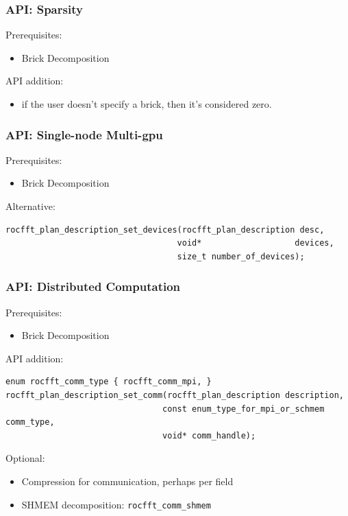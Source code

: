 \documentclass[10pt,aspectratio=169]{beamer}
\begin{document}
\begin{frame}
  \frametitle{API: Sparsity}

  Prerequisites:
  \begin{itemize}
  \item Brick Decomposition
  \end{itemize}

  \bigskip
  
  API addition:
  \begin{itemize}
  \item if the user doesn't specify a brick, then it's considered zero.
  \end{itemize}

\end{frame}

\begin{frame}[fragile]
  \frametitle{API: Single-node Multi-gpu}
  
  Prerequisites:
  \begin{itemize}
  \item Brick Decomposition
  \end{itemize}

  \medskip


  Alternative:
  \begin{lstlisting}
rocfft_plan_description_set_devices(rocfft_plan_description desc,
                                   void*                   devices,
                                   size_t number_of_devices);
  \end{lstlisting}

  \medskip
  
 
\end{frame}

\begin{frame}[fragile]
  \frametitle{API: Distributed Computation}

  Prerequisites:
  \begin{itemize}
  \item Brick Decomposition
  \end{itemize}

  \medskip
  
  API addition:
  \begin{lstlisting}
enum rocfft_comm_type { rocfft_comm_mpi, }
rocfft_plan_description_set_comm(rocfft_plan_description description,
                                const enum_type_for_mpi_or_schmem comm_type,
                                void* comm_handle);
  \end{lstlisting}
  
  \medskip
  

  Optional:
  \begin{itemize}
  \item Compression for communication, perhaps per field
  \item SHMEM decomposition: \lstinline{rocfft_comm_shmem}
  \end{itemize}
  
\end{frame}
\end{document}

